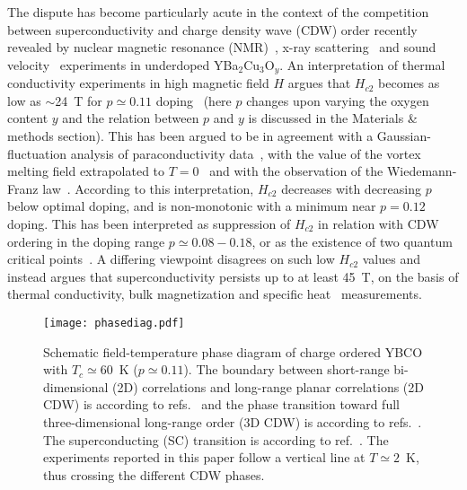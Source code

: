 \documentclass[superscriptaddress,twocolumn,prl,preprintnumbers,amsmath,amssymb]{revtex4}
\begin{document}
The dispute has become particularly acute in the context of the competition between superconductivity and charge density wave (CDW) order recently revealed by nuclear magnetic resonance (NMR)~\cite{Wu11,Wu13,Wu15}, x-ray scattering~\cite{Ghiringhelli12,Chang12,Achkar12,Hucker14,Blanco14,Gerber15,Chang16,Jang16} and sound velocity~\cite{LeBoeuf13} experiments in underdoped YBa$_2$Cu$_3$O$_y$. An interpretation of thermal conductivity experiments in high magnetic field $H$ argues that $H_{c2}$ becomes as low as $\sim$24~T for $p\simeq0.11$ doping~\cite{Grissonnanche14} (here $p$ changes upon varying the oxygen content $y$ and the relation between $p$ and $y$ is discussed in the Materials \& methods section). This has been argued to be in agreement with a Gaussian-fluctuation analysis of paraconductivity data~\cite{Chang12b,Ando02,Rullier11}, with the value of the vortex melting field extrapolated to $T=0$~\cite{Ramshaw12} and with the observation of the Wiedemann-Franz law~\cite{Grissonnanche16}. According to this interpretation, $H_{c2}$ decreases with decreasing $p$ below optimal doping, and is non-monotonic with a minimum near $p=0.12$ doping. This has been interpreted as suppression of $H_{c2}$ in relation with CDW ordering in the doping range $p\simeq 0.08 - 0.18$, or as the existence of two quantum critical points~\cite{Grissonnanche14}. A differing viewpoint disagrees on such low $H_{c2}$ values and instead argues that superconductivity persists up to at least 45~T, on the basis of thermal conductivity, bulk magnetization and specific heat~\cite{Yu16,Riggs11} measurements.



\begin{figure}[t!]%
\centerline{\texttt{[image: phasediag.pdf]}} %
 \caption{Schematic field-temperature phase diagram of charge ordered YBCO with $T_c\simeq 60$~K ($p\simeq 0.11$). The boundary between short-range bi-dimensional (2D) correlations and long-range planar correlations (2D CDW) is according to refs.~\cite{Wu11,Wu13,Chang16} and the phase transition toward full three-dimensional long-range order (3D CDW) is according to refs.~\cite{Gerber15,Chang16,Jang16,LeBoeuf13}. The superconducting (SC) transition is according to ref.~\cite{Grissonnanche14}. The experiments reported in this paper follow a vertical line at $T\simeq 2$~K, thus crossing the different CDW phases. }
 \label{phasediag}
\end{figure}
\end{document}

